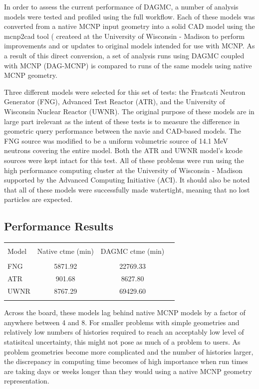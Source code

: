\documentclass[10pt, a4paper]{article}
\begin{document}
In order to assess the current performance of DAGMC, a number of analysis models were tested and profiled using the full workflow. Each of these models was converted from a native MCNP input geometry into a solid CAD model using the mcnp2cad tool ( createed at the University of Wisconsin - Madison to perform improvements and or updates to original models intended for use with MCNP. As a result of this direct conversion, a set of analysis runs using DAGMC coupled with MCNP (DAG-MCNP) is compared to runs of the same models using native MCNP geometry.

Three different models were selected for this set of tests: the Frastcati Neutron Generator (FNG), Advanced Test Reactor (ATR), and the University of Wisconsin Nuclear Reactor (UWNR). The original purpose of these models are in large part irelevant as the intent of these tests is to measure the difference in geometric query performance between the navie and CAD-based models. The FNG source was modified to be a uniform volumetric source of 14.1 MeV neutrons covering the entire model. Both the ATR and UWNR model's kcode sources were kept intact for this test. All of these problems were run using the high performance computing cluster at the University of Wisconsin - Madison supported by the Advanced Computing Initiative (ACI). It should also be noted that all of these models were successfully made watertight, meaning that no lost particles are expected.

\subsection{Performance Results}%

\begin{table}[H]
  \centering
  \begin{tabular}{l c c c}
    \toprule \\
    Model & Native ctme (min) & DAGMC ctme (min) \\
    \hline \\
    FNG &  5871.92 & 22769.33 \\
    ATR &  901.68 & 8627.80 \\
    UWNR &  8767.29 & 69429.60 \\
    \hline \\
  \end{tabular}
\end{table}

Across the board, these models lag behind native MCNP models by a factor of anywhere between 4 and 8. For smaller problems with simple geometries and relatively low numbers of histories required to reach an acceptably low level of statisitcal uncertainty, this might not pose as much of a problem to users. As problem geometries become more complicated and the number of histories larger, the discrepancy in computing time becomes of high importance when run times are taking days or weeks longer than they would using a native MCNP geometry representation.
\end{document}
